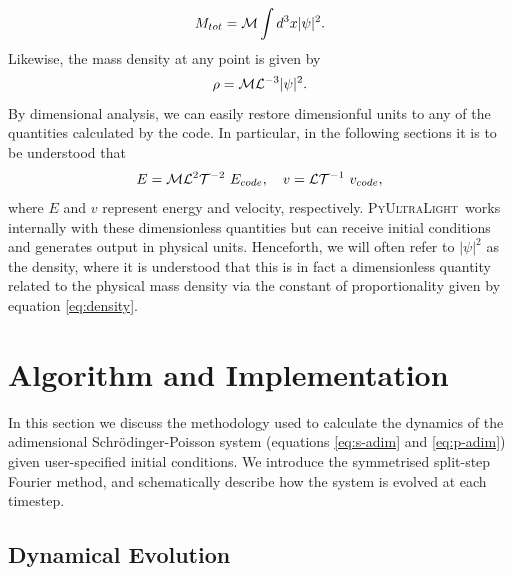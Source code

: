\documentclass[a4paper,11pt]{article}
\newcommand{\PyUltraLight}{\textsc{PyUltraLight}\xspace}
\begin{document}
\begin{equation}\label{eq:integrated-mass}
    M_{tot}=\CMcal{M}\int d^3x\vert\psi\vert^2.
\end{equation}
Likewise, the mass density at any point is given by
\begin{equation}\label{eq:density}
    \rho=\CMcal{M}\CMcal{L}^{-3}\vert\psi\vert^2.
\end{equation}
By dimensional analysis, we can easily restore dimensionful units to any of the quantities calculated by the code. In particular, in the following sections it is to be understood that
\begin{equation}
    E=\CMcal{M}\CMcal{L}^2\CMcal{T}^{-2}\ E_{code}, \quad v=\CMcal{L}\CMcal{T}^{-1}\ v_{code}, 
\end{equation}
where $E$ and $v$ represent energy and velocity, respectively. \PyUltraLight\ works internally with these dimensionless quantities but can receive initial conditions and generates output in physical units. Henceforth, we will often refer to $\vert\psi\vert^2$  as the density, where it is understood that this is in fact a dimensionless quantity related to the physical mass density via the constant of proportionality given by equation \ref{eq:density}.




\section{Algorithm and Implementation}\label{sec:implementation}

In this section we discuss the methodology used to calculate the dynamics of the adimensional  Schr{\"o}dinger-Poisson system (equations \ref{eq:s-adim} and \ref{eq:p-adim}) given user-specified initial conditions. We introduce the symmetrised split-step Fourier method, and schematically describe  how the system is evolved at each timestep. 

\subsection{Dynamical Evolution}\label{sec:dynamics}
\end{document}
